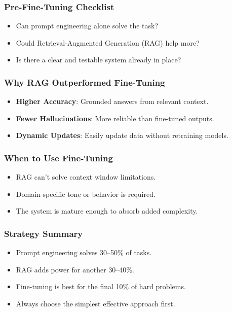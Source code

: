 \begin{frame}[fragile]\frametitle{Pre-Fine-Tuning Checklist}
    \begin{itemize}
        \item Can prompt engineering alone solve the task?
        \item Could Retrieval-Augmented Generation (RAG) help more?
        \item Is there a clear and testable system already in place?
    \end{itemize}
\end{frame}

\begin{frame}[fragile]\frametitle{Why RAG Outperformed Fine-Tuning}
    \begin{itemize}
        \item \textbf{Higher Accuracy}: Grounded answers from relevant context.
        \item \textbf{Fewer Hallucinations}: More reliable than fine-tuned outputs.
        \item \textbf{Dynamic Updates}: Easily update data without retraining models.
    \end{itemize}
\end{frame}

\begin{frame}[fragile]\frametitle{When to Use Fine-Tuning}
    \begin{itemize}
        \item RAG can't solve context window limitations.
        \item Domain-specific tone or behavior is required.
        \item The system is mature enough to absorb added complexity.
    \end{itemize}
\end{frame}

\begin{frame}[fragile]\frametitle{Strategy Summary}
    \begin{itemize}
        \item Prompt engineering solves 30--50\% of tasks.
        \item RAG adds power for another 30--40\%.
        \item Fine-tuning is best for the final 10\% of hard problems.
        \item Always choose the simplest effective approach first.
    \end{itemize}
\end{frame}

